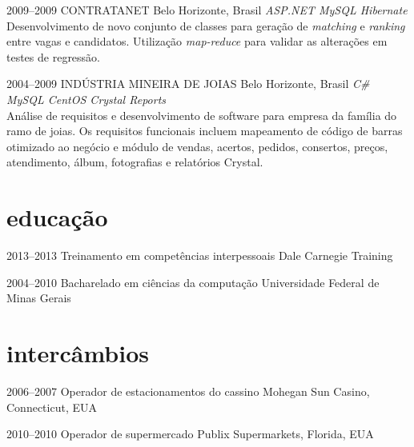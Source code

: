\documentclass[]{friggeri-cv}
\begin{document}
\begin{entrylist}
\entry
{2009--2009}
{CONTRATANET}
{Belo Horizonte, Brasil}
{\emph{\bullet ASP.NET \bullet MySQL \bullet Hibernate } \\ Desenvolvimento de novo conjunto de classes para geração de \textit{matching} e \textit{ranking} entre vagas e candidatos. Utilização \textit{map-reduce} para validar as alterações em testes de regressão. }


%
 \entry
 {2004--2009}
 {INDÚSTRIA MINEIRA DE JOIAS}
 {Belo Horizonte, Brasil}
 {\emph{\bullet C\# \bullet MySQL \bullet CentOS \bullet Crystal Reports } \\ Análise de requisitos e desenvolvimento de software para empresa da família do ramo de joias. Os requisitos funcionais incluem mapeamento de código de barras otimizado ao negócio e módulo de vendas, acertos, pedidos, consertos, preços, atendimento, álbum, fotografias e relatórios Crystal.}
%

\end{entrylist}



\section{educação}

\begin{entrylist}


\entry
{2013--2013}
{Treinamento {\normalfont em competências interpessoais}}
{Dale Carnegie Training}

\entry
{2004--2010}
{Bacharelado {\normalfont em ciências da computação}}
{Universidade Federal de Minas Gerais}



\end{entrylist}


\section{intercâmbios} 

\begin{entrylist}

\entry
{2006--2007}
{Operador {\normalfont de estacionamentos do cassino}}
{Mohegan Sun Casino, Connecticut, EUA}

\entry
{2010--2010} 
{Operador {\normalfont de supermercado}}
{Publix Supermarkets, Florida, EUA}

\end{entrylist}
\end{document}
